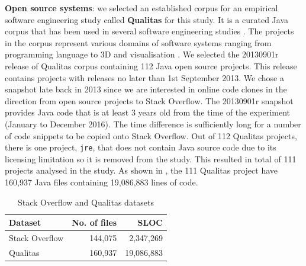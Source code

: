 \documentclass{sig-alternate-05-2015}
\begin{document}
\textbf{Open source systems}: we selected an established corpus for an empirical software engineering study called \textbf{Qualitas} \cite{QualitasCorpus} for this study. It is a curated Java corpus that has been used in several software engineering studies \cite{Taube-Schock2011,Beckman2011,Vasilescu2011,Omar2012}. The projects in the corpus represent various domains of software systems ranging from programming language to 3D and visualisation \cite{QualitasCorpus}. We selected the 20130901r release of Qualitas corpus containing 112 Java open source projects. This release contains projects with releases no later than 1st September 2013. We chose a snapshot late back in 2013 since we are interested in online code clones in the direction from open source projects to Stack Overflow. The 20130901r snapshot provides Java code that is at least 3 years old from the time of the experiment (January to December 2016). The time difference is sufficiently long for a number of code snippets to be copied onto Stack Overflow. Out of 112 Qualitas projects, there is one project, \texttt{jre}, that does not contain Java source code due to its licensing limitation \cite{QualitasCorpus} so it is removed from the study. This resulted in total of 111 projects analysed in the study. As shown in , the 111 Qualitas project have 160,937 Java files containing 19,086,883 lines of code. %

\begin{table}
	\centering
	\caption{Stack Overflow and Qualitas datasets}
	\label{tab:datasets}
	\small
	\begin{tabular}{l|r|r}
		\hline 
		Dataset & No. of files & SLOC \\
		\hline
		Stack Overflow & 144,075 & 2,347,269 \\ 
		\hline 
		Qualitas &  160,937 & 19,086,883 \\ 
		\hline 
	\end{tabular} 
\end{table}
\end{document}
